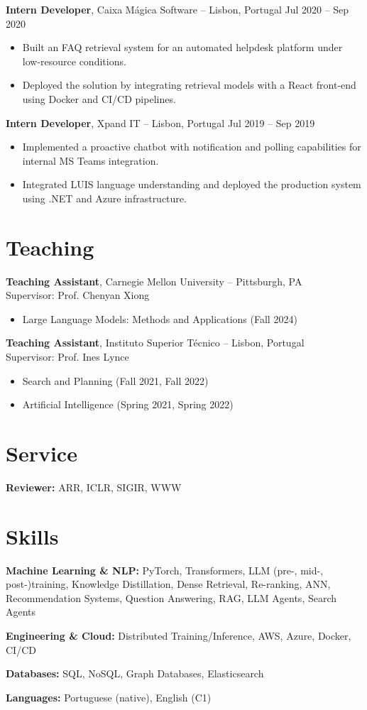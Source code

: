 \documentclass[11pt]{article}       %
\newcommand{\keep}{\par\vspace{0pt plus 8\baselineskip}\penalty-200\vspace{0pt plus -8\baselineskip}}
\begin{document}
\keep
\textbf{Intern Developer}, Caixa Mágica Software -- Lisbon, Portugal \hfill Jul 2020 -- Sep 2020
\begin{itemize}
  \item Built an FAQ retrieval system for an automated helpdesk platform under low-resource conditions.
  \item Deployed the solution by integrating retrieval models with a React front-end using Docker and CI/CD pipelines.
\end{itemize}

\keep
\textbf{Intern Developer}, Xpand IT -- Lisbon, Portugal \hfill Jul 2019 -- Sep 2019
\begin{itemize}
  \item Implemented a proactive chatbot with notification and polling capabilities for internal MS Teams integration.
  \item Integrated LUIS language understanding and deployed the production system using .NET and Azure infrastructure.
\end{itemize}


\keep
\section*{Teaching}
\textbf{Teaching Assistant}, Carnegie Mellon University -- Pittsburgh, PA \\
Supervisor: Prof. Chenyan Xiong
\begin{itemize}
  \item Large Language Models: Methods and Applications (Fall 2024)
\end{itemize}

\keep
\textbf{Teaching Assistant}, Instituto Superior Técnico -- Lisbon, Portugal \\
Supervisor: Prof. Ines Lynce
\begin{itemize}
  \item Search and Planning (Fall 2021, Fall 2022)
  \item Artificial Intelligence (Spring 2021, Spring 2022)
\end{itemize}


\keep
\section*{Service}
\textbf{Reviewer:} ARR, ICLR, SIGIR, WWW


\section*{Skills}
\textbf{Machine Learning \& NLP:}
PyTorch, Transformers, LLM (pre-, mid-, post-)training, Knowledge Distillation, Dense Retrieval, Re-ranking, ANN, Recommendation Systems, Question Answering, RAG, LLM Agents, Search Agents

\textbf{Engineering \& Cloud:}
Distributed Training/Inference, AWS, Azure, Docker, CI/CD

\textbf{Databases:}
SQL, NoSQL, Graph Databases, Elasticsearch

\textbf{Languages:} Portuguese (native), English (C1)
\end{document}
